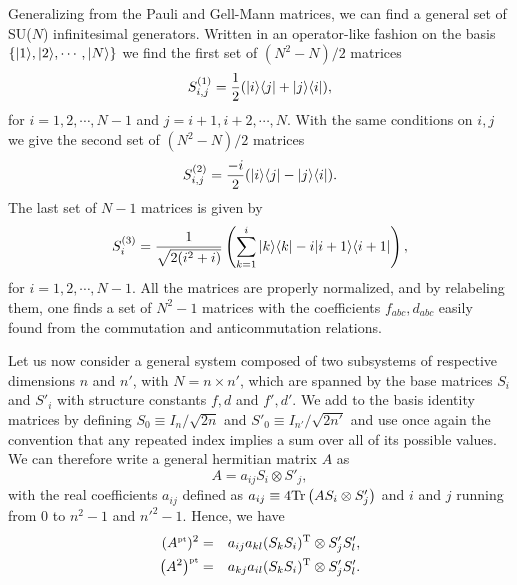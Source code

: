  Generalizing from the Pauli and Gell-Mann matrices, we can find a general set of SU($N$) infinitesimal generators. Written in an operator-like fashion on the basis $\{ | 1 \rangle, | 2 \rangle, \cdots, | N \rangle \}$ we find the first set of $(N^2-N)/2$ matrices
\[ S^{(1)}_{i,j} =\frac 1 2 ( | i \rangle \langle j | + | j \rangle \langle i | ) ,\]
 for $i=1,2,\cdots, N-1$ and $j=i+1,i+2,\cdots, N$. With the same conditions on $i,j$ we give the second set of  $(N^2-N)/2$ matrices
\[ S^{(2)}_{i,j} =\frac{-i}2 ( | i \rangle \langle j | - | j \rangle \langle i | ).\]
The last set of $N-1$ matrices is given by
\[ S^{(3)}_{i} =\frac{1}{\sqrt{2(i^2+i)}} \left( \sum_{k=1}^i | k \rangle \langle k | - i | i+1 \rangle \langle i+1 | \right),\]
for $i=1,2,\cdots, N-1$. All the matrices are properly normalized, and by relabeling them, one finds a set of $N^2-1$ matrices with the coefficients $f_{abc}, d_{abc}$ easily found from the commutation and anticommutation relations. 

Let us now consider a general system composed of two subsystems of respective dimensions $n$ and $n'$, with $N=n\times n'$, which are spanned by the base matrices $S_i$ and $S'_i$ with structure constants $f, d$ and $f', d'$. We add to the basis identity matrices by defining $S_0 \equiv I_n / \sqrt{2n}$ and $S'_0\equiv I_{n'}/ \sqrt{2n'}$ and use once again the convention that any repeated index implies a sum over all of its possible values. We can therefore write a general hermitian matrix $A$ as
\[ A = a_{ij} S_i \otimes S'_j, \]
with the real coefficients $a_{ij}$ defined as $a_{ij} \equiv 4 \mbox{\textup{Tr}}\left( A S_i \otimes S'_j \right)$ and $i$ and $j$ running from 0 to $n^2-1$ and ${n'}^2-1$. Hence, we have 
\begin{eqnarray}
(A^{\mbox{\tiny \textup{pt}}})^2 &=& a_{ij} a_{kl} (S_k S_i)^{\textrm{T}} \otimes S'_j S'_l, \label{eq-Apt2}\\
\left(A^2 \right)^{\mbox{\tiny \textup{pt}}} &=& a_{kj} a_{il}  (S_k S_i)^{\textrm{T}}  \otimes S'_j S'_l. \label{eq-A2pt}
\end{eqnarray}


